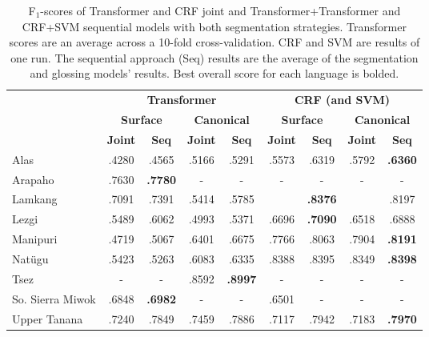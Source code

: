 \begin{table}[!tb]
    \centering
    \begin{tabular}{l|cc|cc|cc|cc}
          & \multicolumn{4}{c|}{\textbf{Transformer}} & \multicolumn{4}{c}{\textbf{CRF (and SVM)}} 
          \\
          & \multicolumn{2}{c|}{\textbf{Surface}} & \multicolumn{2}{c|}{\textbf{Canonical}}  & \multicolumn{2}{c|}{\textbf{Surface}} & \multicolumn{2}{c}{\textbf{Canonical}} 
          \\
          &  \textbf{Joint} & \textbf{Seq} &  \textbf{Joint} & \textbf{Seq} &  \textbf{Joint} & \textbf{Seq} &  \textbf{Joint} & \textbf{Seq} \\
         \hline
         Alas & .4280 & .4565 & .5166 & .5291 
              & .5573 & .6319 & .5792 & \textbf{.6360} \\
         \hline
         Arapaho & .7630 & \textbf{.7780} & - & - 
                 & - & - & - & -  \\
         \hline
         Lamkang & .7091 & .7391 & .5414 & .5785 
         &  & \textbf{.8376} &  & .8197 \\
         \hline
         Lezgi  & .5489 & .6062 & .4993 & .5371 
                & .6696 & \textbf{.7090} & .6518 & .6888 \\
         \hline
         Manipuri & .4719 & .5067 & .6401 & .6675 
                  & .7766 & .8063 & .7904 & \textbf{.8191} \\
         \hline
         Natügu & .5423 & .5263 & .6083 & .6335 
                & .8388 & .8395 & .8349 & \textbf{.8398} \\
         \hline
         Tsez & - & - & .8592 & \textbf{.8997} 
              & - & - & - & - \\
         \hline
         So. Sierra Miwok & .6848 & \textbf{.6982} & - & - 
                          & .6501 & - & - & - \\
         \hline
         Upper Tanana & .7240 & .7849 & .7459 & .7886
                      & .7117 & .7942 & .7183 & \textbf{.7970} \\
    \end{tabular}
    \caption[Results of All Segmentation and Glossing Models]{F$_1$-scores of Transformer and CRF joint and Transformer+Transformer and CRF+SVM sequential models with both segmentation strategies. Transformer scores are an average across a 10-fold cross-validation. CRF and SVM are results of one run. The sequential approach (Seq) results are the average of the segmentation and glossing models' results. Best overall score for each language is bolded.}
    \label{tab:allsgresults}
\end{table}

